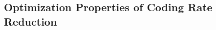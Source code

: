 \documentclass[../../book-main.tex]{subfiles}
\begin{document}


\vspace{-0.1in}


\subsection{Optimization Properties of Coding Rate Reduction}
\label{sec:MCR-landscape}
\end{document}
